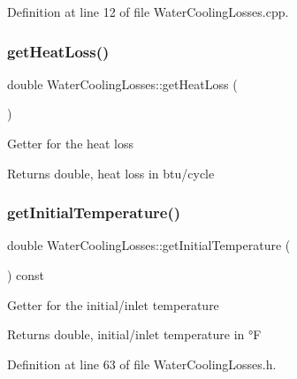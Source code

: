 Definition at line 12 of file Water\+Cooling\+Losses.\+cpp.

\mbox{\label{class_water_cooling_losses_a8f884cc70d7af7add5bb1be7f837384c}} 
\subsubsection{\texorpdfstring{get\+Heat\+Loss()}{getHeatLoss()}\hspace{0.1cm}{\footnotesize\ttfamily [3/3]}}
{\footnotesize\ttfamily double Water\+Cooling\+Losses\+::get\+Heat\+Loss (\begin{DoxyParamCaption}{ }\end{DoxyParamCaption})}

Getter for the heat loss \begin{DoxyReturn}{Returns}
double, heat loss in btu/cycle 
\end{DoxyReturn}
\mbox{\label{class_water_cooling_losses_a205b469029ec9cd4d792169bf8589f24}} 
\subsubsection{\texorpdfstring{get\+Initial\+Temperature()}{getInitialTemperature()}\hspace{0.1cm}{\footnotesize\ttfamily [1/3]}}
{\footnotesize\ttfamily double Water\+Cooling\+Losses\+::get\+Initial\+Temperature (\begin{DoxyParamCaption}{ }\end{DoxyParamCaption}) const\hspace{0.3cm}{\ttfamily [inline]}}

Getter for the initial/inlet temperature \begin{DoxyReturn}{Returns}
double, initial/inlet temperature in °F 
\end{DoxyReturn}


Definition at line 63 of file Water\+Cooling\+Losses.\+h.

\mbox{\label{class_water_cooling_losses_a205b469029ec9cd4d792169bf8589f24}} 

